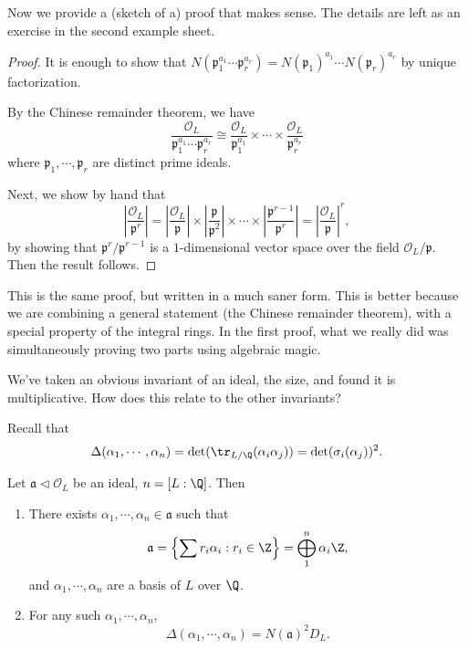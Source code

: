 \documentclass[a4paper]{article}
\begin{document}
Now we provide a (sketch of a) proof that makes sense. The details are left as an exercise in the second example sheet.
\begin{proof}
  It is enough to show that $N(\mathfrak{p}_1^{a_1} \cdots \mathfrak{p}_r^{a_r}) = N(\mathfrak{p}_1)^{a_1} \cdots N(\mathfrak{p}_r)^{a_r}$ by unique factorization.

  By the Chinese remainder theorem, we have
  \[
    \frac{\mathcal{O}_L}{\mathfrak{p}_1^{a_1} \cdots \mathfrak{p}_r^{a_r}} \cong \frac{\mathcal{O}_L}{\mathfrak{p}_1^{a_1}} \times \cdots \times \frac{\mathcal{O}_L}{\mathfrak{p}_r^{a_r}}
  \]
  where $\mathfrak{p}_1, \cdots, \mathfrak{p}_r$ are distinct prime ideals.

  Next, we show by hand that
  \[
    \left|\frac{\mathcal{O}_L}{\mathfrak{p}^r}\right| = \left|\frac{\mathcal{O}_L}{\mathfrak{p}}\right| \times \left|\frac{\mathfrak{p}}{\mathfrak{p}^2}\right| \times \cdots \times \left|\frac{\mathfrak{p}^{r - 1}}{\mathfrak{p}^r}\right| = \left|\frac{\mathcal{O}_L}{\mathfrak{p}}\right|^r,
  \]
  by showing that $\mathfrak{p}^r/\mathfrak{p}^{r - 1}$ is a $1$-dimensional vector space over the field $\mathcal{O}_L/\mathfrak{p}$. Then the result follows.
\end{proof}
This is the same proof, but written in a much saner form. This is better because we are combining a general statement (the Chinese remainder theorem), with a special property of the integral rings. In the first proof, what we really did was simultaneously proving two parts using algebraic magic.

We've taken an obvious invariant of an ideal, the size, and found it is multiplicative. How does this relate to the other invariants?

Recall that
\[
  \Delta(\alpha_1, \cdots, \alpha_n) = \det(\tr_{L/\Q}(\alpha_i\alpha_j)) = \det(\sigma_i(\alpha_j))^2.
\]
\begin{lemma}
  Let $\mathfrak{a} \lhd \mathcal{O}_L$ be an ideal, $n = [L:\Q]$. Then
  \begin{enumerate}
    \item There exists $\alpha_1, \cdots, \alpha_n \in \mathfrak{a}$ such that
      \[
        \mathfrak{a} = \left\{ \sum r_i \alpha_i : r_i \in \Z\right\} = \bigoplus_{1}^n \alpha_i\Z,
      \]
      and $\alpha_1, \cdots, \alpha_n$ are a basis of $L$ over $\Q$.
    \item For any such $\alpha_1, \cdots, \alpha_n$,
      \[
        \Delta (\alpha_1, \cdots, \alpha_n) = N(\mathfrak{a})^2 D_L.
      \]
  \end{enumerate}
\end{lemma}
\end{document}

